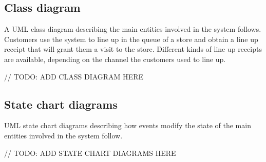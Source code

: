 \documentclass[../../main.tex]{subfiles}
\begin{document}
\subsection{Class diagram}

A UML class diagram describing the main entities involved in the system follows. Customers use the system to line up in the queue of a store and obtain a line up receipt that will grant them a visit to the store. Different kinds of line up receipts are available, depending on the channel the customers used to line up.

// TODO: ADD CLASS DIAGRAM HERE

\subsection{State chart diagrams}

UML state chart diagrams describing how events modify the state of the main entities involved in the system follow.

// TODO: ADD STATE CHART DIAGRAMS HERE
\end{document}
